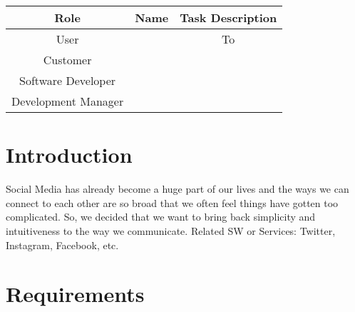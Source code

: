 \documentclass[conference]{IEEEtran}
\numberwithin{figure}{subsection}
\begin{document}
\begin{tabular}{|c|c|c|}
    \hline
    Role & Name & Task Description\\
    \hline
    User    & & To\\
    \hline
    Customer & & \\
    \hline
    Software Developer & &\\
    \hline
    Development Manager & &\\
    \hline

\end{tabular}
\newline
\section{Introduction} 
Social Media has already become a huge part of our lives and the ways we can connect to each other are so broad that we often feel things have gotten too complicated. So, we decided that we want to bring back simplicity and intuitiveness to the way we communicate. Related SW or Services: Twitter, Instagram, Facebook, etc. 
\newline

\section{Requirements}
\end{document}
